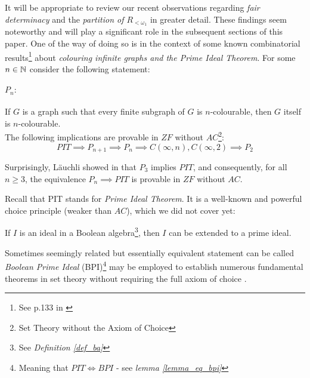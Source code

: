 It will be appropriate to review our recent observations regarding \textit{fair determinacy} and the \textit{partition of $R_{<\omega_1}$} in greater detail. These findings seem noteworthy and will play a significant role in the subsequent sections of this paper. One of the way of doing so is in the context of some known combinatorial results\footnote{See p.133 in \cite{halbeisen2012}} about \textit{colouring infinite graphs and the Prime Ideal Theorem}. For some $n \in \mathbb{N}$ consider the following statement: 

\paragraph{$P_n:$} If $G$ is a graph such that every finite subgraph of $G$ is $n$-colourable, \indent \indent then $G$ itself is $n$-colourable.
\\

The following implications are provable in $ZF$ without $AC$\footnote{Set Theory without the Axiom of Choice}:
  \[ PIT \implies P_{n+1} \implies P_{n} \implies C(\infty, n), C(\infty,2) \implies P_2 \]

Surprisingly, L{\"a}uchli showed in \cite{Luchli1971ColoringIG} that $P_3$ implies $PIT$, and consequently, for all $n \geq 3$, the equivalence $P_n \implies PIT$ is provable in $ZF$ without $AC$.

Recall that PIT stands for \textit{Prime Ideal Theorem}. It is a well-known and powerful choice principle (weaker than $AC$), which we did not cover yet:

\begin{theorem}\label{theorem_pit_bool}
  If $I$ is an ideal in a Boolean algebra\footnote{See \textit{Definition \ref{def_ba}}}, then $I$ can be extended to a prime ideal.
\end{theorem}

Sometimes seemingly related but essentially equivalent statement can be called \textit{Boolean Prime Ideal} (BPI)\footnote{Meaning that $PIT \Longleftrightarrow  BPI$ - see \textit{lemma \ref{lemma_eq_bpi}}} may be employed to establish numerous fundamental theorems in set theory without requiring the full axiom of choice \cite{karagila2020zornian}.

